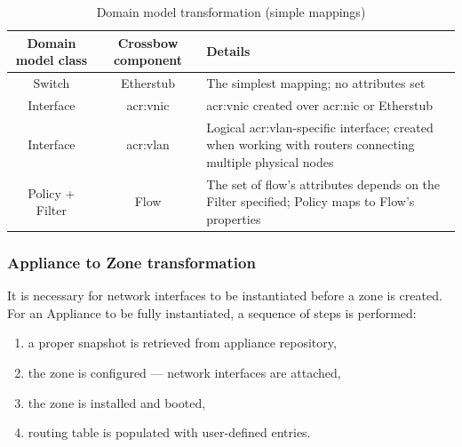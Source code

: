 \documentclass[11pt,openany]{book}
\begin{document}
          \begin{table}[H]
            \centering

            \begin{tabularx}{\textwidth}{|c|c|X|}
              \hline
              Domain model class & Crossbow component & \centering Details \tabularnewline
              \hline \hline
              Switch             & Etherstub          & The simplest mapping; no attributes set \\
              \hline
              Interface          & \gls{acr:vnic}     & \gls{acr:vnic} created over \gls{acr:nic} or Etherstub \\
              \hline
              Interface          & \gls{acr:vlan}     & Logical \gls{acr:vlan}-specific interface; created when working
                                                        with routers connecting multiple physical nodes \\
              \hline
              Policy + Filter    & Flow               & The set of flow's attributes depends on the Filter specified;
                                                        Policy maps to Flow's properties \\
              \hline
            \end{tabularx}

            \caption{Domain model transformation (simple mappings)}
            \label{tab:impl:simple-mapping}
          \end{table}


        \subsubsection{Appliance to Zone transformation}

          It is necessary for network interfaces to be instantiated before a zone is created. For an Appliance to be
          fully instantiated, a sequence of steps is performed:

          \begin{enumerate}
            \item a proper snapshot is retrieved from appliance repository,
            \item the zone is configured --- network interfaces are attached,
            \item the zone is installed and booted,
            \item routing table is populated with user-defined entries.
          \end{enumerate}
\end{document}
